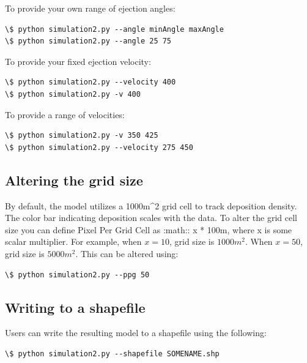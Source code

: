 \documentclass[letterpaper,10pt,english]{sphinxmanual}
\begin{document}
To provide your own range of ejection angles:

\begin{Verbatim}[commandchars=\\\{\}]
\$ python simulation2.py --angle minAngle maxAngle
\$ python simulation2.py --angle 25 75
\end{Verbatim}

To provide your fixed ejection velocity:

\begin{Verbatim}[commandchars=\\\{\}]
\$ python simulation2.py --velocity 400
\$ python simulation2.py -v 400
\end{Verbatim}

To provide a range of velocities:

\begin{Verbatim}[commandchars=\\\{\}]
\$ python simulation2.py -v 350 425
\$ python simulation2.py --velocity 275 450
\end{Verbatim}


\subsection{Altering the grid size}
\label{Using:altering-the-grid-size}
By default, the model utilizes a 1000m\textasciicircum{}2 grid cell to track deposition density.  The color bar indicating deposition scales with the data.  To alter the grid cell size you can define Pixel Per Grid Cell as :math:: x * 100m, where x is some scalar multiplier.  For example, when $x = 10$, grid size is $1000m^2$.  When $x = 50$, grid size is $5000m^2$.  This can be altered using:

\begin{Verbatim}[commandchars=\\\{\}]
\$ python simulation2.py --ppg 50
\end{Verbatim}


\subsection{Writing to a shapefile}
\label{Using:writing-to-a-shapefile}
Users can write the resulting model to a shapefile using the following:

\begin{Verbatim}[commandchars=\\\{\}]
\$ python simulation2.py --shapefile SOMENAME.shp
\end{Verbatim}
\end{document}
